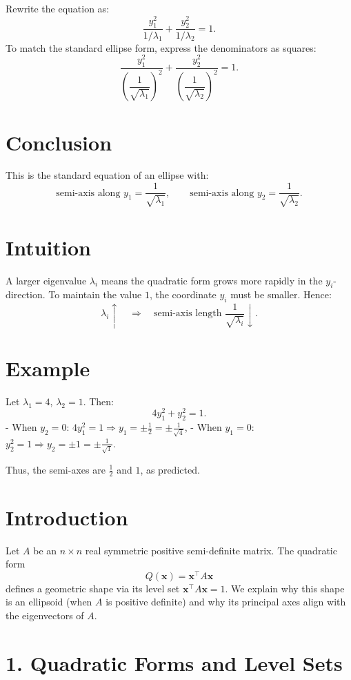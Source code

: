 \documentclass{article}
\begin{document}
Rewrite the equation as:
\[
\frac{y_1^2}{1/\lambda_1} + \frac{y_2^2}{1/\lambda_2} = 1.
\]
To match the standard ellipse form, express the denominators as squares:
\[
\frac{y_1^2}{\left( \dfrac{1}{\sqrt{\lambda_1}} \right)^2} + \frac{y_2^2}{\left( \dfrac{1}{\sqrt{\lambda_2}} \right)^2} = 1.
\]

\section*{Conclusion}

This is the standard equation of an ellipse with:
\[
\text{semi-axis along } y_1 = \frac{1}{\sqrt{\lambda_1}}, \qquad
\text{semi-axis along } y_2 = \frac{1}{\sqrt{\lambda_2}}.
\]

\section*{Intuition}

A larger eigenvalue $ \lambda_i $ means the quadratic form grows more rapidly in the $ y_i $-direction. To maintain the value $ 1 $, the coordinate $ y_i $ must be smaller. Hence:
\[
\lambda_i \uparrow \quad \Rightarrow \quad \text{semi-axis length } \frac{1}{\sqrt{\lambda_i}} \downarrow.
\]

\section*{Example}

Let $ \lambda_1 = 4 $, $ \lambda_2 = 1 $. Then:
\[
4y_1^2 + y_2^2 = 1.
\]
- When $ y_2 = 0 $: $ 4y_1^2 = 1 \Rightarrow y_1 = \pm \tfrac{1}{2} = \pm \tfrac{1}{\sqrt{4}} $,
- When $ y_1 = 0 $: $ y_2^2 = 1 \Rightarrow y_2 = \pm 1 = \pm \tfrac{1}{\sqrt{1}} $.

Thus, the semi-axes are $ \tfrac{1}{2} $ and $ 1 $, as predicted.


\section*{Introduction}

Let $ A $ be an $ n \times n $ real symmetric positive semi-definite matrix.  
The quadratic form
\[
Q(\mathbf{x}) = \mathbf{x}^\top A \mathbf{x}
\]
defines a geometric shape via its level set $ \mathbf{x}^\top A \mathbf{x} = 1 $.  
We explain why this shape is an ellipsoid (when $ A $ is positive definite) and why its principal axes align with the eigenvectors of $ A $.

\section*{1. Quadratic Forms and Level Sets}
\end{document}
